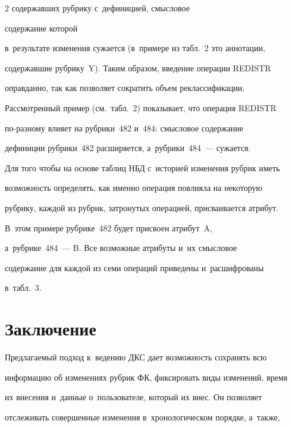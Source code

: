 \begin{multicols}{2}
содержавших рубрику с~дефиницией, смысловое


содержание которой 


в~результате изменения сужается (в~примере из табл.~2 это аннотации, 


содержавшие руб\-ри\-ку~Y). Таким образом, введение операции \mbox{REDISTR} 


оправданно, так как позволяет сократить объем реклассификации.





Рассмотренный пример (см.\ табл.~2) показывает, что операция REDISTR  


по-раз\-но\-му влияет на руб\-ри\-ки~482 и~484: смысловое содержание 


дефиниции руб\-ри\-ки~482 расширяется, а~руб\-ри\-ки~484~--- сужается. 


Для того чтобы на основе таб\-лиц НБД с~историей изменения руб\-рик иметь 


возможность определять, как именно операция повлияла на некоторую 


руб\-ри\-ку, каждой из руб\-рик, затронутых операцией, присваивается атрибут. 


В~этом примере руб\-ри\-ке~482 будет присвоен атрибут~A,  


а~руб\-ри\-ке~484~--- B. Все возможные атрибуты и~их смыс\-ло\-вое 


содержание для каждой из семи операций приведены и~расшифрованы 


в~табл.~3.





\vspace*{-3pt}





\section{Заключение}





Предлагаемый подход к~ведению ДКС дает возможность сохранять всю 


информацию об изменениях рубрик ФК, фиксировать виды изменений, время 


их внесения и~данные о~пользователе, который их внес. Он позволяет 


отслеживать совершенные изменения в~хронологическом порядке, а~также, 



\end{multicols}
